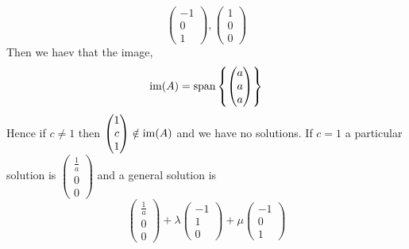 \documentclass{article}
\numberwithin{equation}{section}
\begin{document}
\begin{eg}
\begin{enumerate}[label=(\arabic*)]
\begin{enumerate}
\[{\begin{pmatrix}
                        -1 \\ 0 \\ 1
                    \end{pmatrix},
                    \begin{pmatrix}
                        1 \\ 0 \\ 0
                    \end{pmatrix}
                }   
            \]
            Then we haev that the image,
            \[
                \operatorname{im}(A) = \operatorname{span} \left\{ \begin{pmatrix}
                    a \\ a \\ a
                \end{pmatrix} \right\}
            \]
            Hence if $c \neq 1$ then $\begin{pmatrix}
                1 \\ c \\ 1
            \end{pmatrix} \notin \operatorname{im}(A)$ and we have no solutions.
            If $c = 1$ a particular solution is $\begin{pmatrix}
                \frac{1}{a} \\ 0 \\ 0
            \end{pmatrix}$ and a general solution is
            \[
                \begin{pmatrix}
                    \frac{1}{a} \\ 0 \\ 0
                \end{pmatrix} 
                + \lambda \begin{pmatrix}
                    -1 \\ 1 \\ 0
                \end{pmatrix}
                + \mu \begin{pmatrix}
                    -1 \\ 0 \\ 1
                \end{pmatrix}
            \]


\end{enumerate}
\end{enumerate}
\end{eg}
\end{document}
